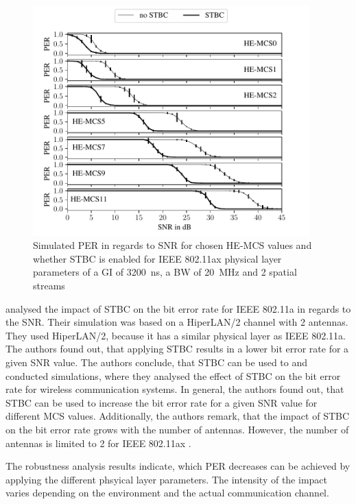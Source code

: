 \begin{figure}%
	\centering
	\includegraphics[width=0.95\textwidth]{figures/STBC_PER_to_SNR.pdf}
	\caption{Simulated \ac{PER} in regards to \ac{SNR} for chosen HE-\ac{MCS} values and whether \ac{STBC} is enabled for IEEE 802.11ax physical layer parameters of a \ac{GI} of \SI{3200}{\nano\second}, a \ac{BW} of \SI{20}{\mega\hertz} and 2 spatial streams}%
	\label{fig:PER_SNR_STBC}%
\end{figure}
\textcite{stamoulis_impact_2003} analysed the impact of \ac{STBC} on the bit error rate for IEEE 802.11a in regards to the \ac{SNR}. Their simulation was based
on a HiperLAN/2 channel with \num{2} antennas. They used HiperLAN/2, because it has a similar physical layer as IEEE 802.11a.
The authors found out, that applying \ac{STBC} results in a lower bit error rate for a given \ac{SNR} value. The authors conclude, that \ac{STBC} can be used to
\textcite{santumon_space-time_2012} and \textcite{tarokh_space-time_1999} conducted simulations, where they analysed the effect of \ac{STBC} on the bit error rate for
wireless communication systems. In general, the authors found out, that \ac{STBC} can be used to increase the bit error rate for a given \ac{SNR} value for different
\ac{MCS} values. Additionally, the authors remark, that the impact of \ac{STBC} on the bit error rate grows with the number of antennas.
However, the number of antennas is limited to \num{2} for IEEE 802.11ax \cite{noauthor_ieee_2021}.

The robustness analysis results indicate, which \ac{PER} decreases can be achieved by applying the different phsyical layer parameters.
The intensity of the impact varies depending on the environment and the actual communication channel.

